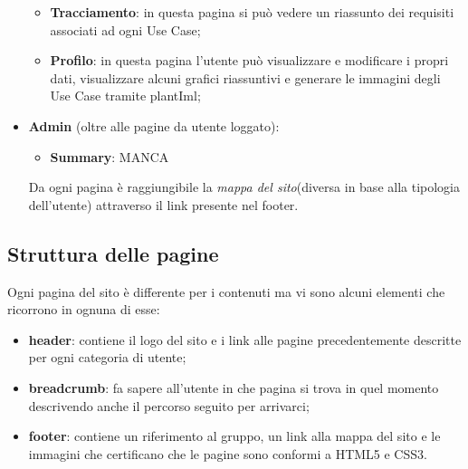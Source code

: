 \begin{itemize}
\begin{itemize}
		\item \textbf{Tracciamento}: in questa pagina si può vedere un riassunto dei requisiti associati ad ogni Use Case;
		\item \textbf{Profilo}: in questa pagina l'utente può visualizzare e modificare i propri dati, visualizzare alcuni grafici riassuntivi e generare le immagini degli Use Case tramite plantIml;
	\end{itemize}
	\item \textbf{Admin} (oltre alle pagine da utente loggato):
	\begin{itemize}
		\item \textbf{Summary}: MANCA
	\end{itemize}
Da ogni pagina è raggiungibile la \textit{mappa del sito}(diversa in base alla tipologia dell'utente) attraverso il link presente nel footer.
\end{itemize}
\subsection{Struttura delle pagine}
Ogni pagina del sito è differente per i contenuti ma vi sono alcuni elementi che ricorrono in ognuna di esse:
\begin{itemize}
	\item \textbf{header}: contiene il logo del sito e i link alle pagine precedentemente descritte per ogni categoria di utente;
	\item \textbf{breadcrumb}: fa sapere all'utente in che pagina si trova in quel momento descrivendo anche il percorso seguito per arrivarci;
	\item \textbf{footer}: contiene un riferimento al gruppo, un link alla mappa del sito e le immagini che certificano che le pagine sono conformi a HTML5 e CSS3.
\end{itemize}